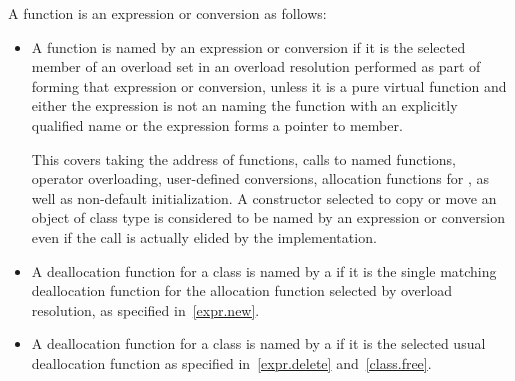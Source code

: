 \pnum
A function is 
an expression or conversion as follows:
\begin{itemize}
\item
  A function is named by an expression or conversion
  if it is the selected member
  of an overload set
  in an overload resolution performed
  as part of forming that expression or conversion,
  unless it is a pure virtual function and either
  the expression is not an  naming the function with
  an explicitly qualified name or
  the expression forms a pointer to member.
  \begin{note}
This covers
  taking the address of functions,
  calls to named functions,
  operator overloading,
  user-defined conversions,
  allocation functions for , as well as
  non-default initialization.
  A constructor selected to copy or move an object of class type
  is considered to be named by an expression or conversion
  even if the call is actually elided by the implementation.
\end{note}
\item
  A deallocation function for a class
  is named by a 
  if it is the single matching deallocation function
  for the allocation function selected by overload resolution,
  as specified in~\ref{expr.new}.
\item
  A deallocation function for a class
  is named by a 
  if it is the selected usual deallocation function
  as specified in~\ref{expr.delete} and~\ref{class.free}.
\end{itemize}

